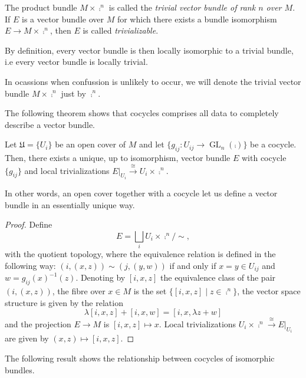 \begin{defi}\label{trivial_bundle}
  The product bundle $M\times \comp^n$ is called the \emph{trivial
    vector bundle of rank $n$ over $M$}. If $E$ is a vector bundle
  over $M$ for which there exists a bundle isomorphism
  $E\to M\times \comp^n$, then $E$ is called \emph{trivializable}.
\end{defi}

By definition, every vector bundle is then locally isomorphic to a
trivial bundle, i.e every vector bundle is locally trivial.

\begin{notation}
  In ocassions when confussion is unlikely to occur, we will denote
  the trivial vector bundle $M\times \comp^n$ just by $\comp^n$.
\end{notation}

The following theorem shows that cocycles comprises all data to
completely describe a vector bundle.

\begin{theorem}\label{construct_bundles}
  Let $\mathfrak{U}=\{U_i\}$ be an open cover of $M$ and let
  $\{g_{ij}:U_{ij}\to \operatorname{GL}_n(\comp )\}$ be a
  cocycle. Then, there exists a unique, up to isomorphism, vector
  bundle $E$ with cocycle $\{g_{ij}\}$ and local trivializations
  $E|_{U_i}\stackrel{\cong}{\longrightarrow}U_i\times \comp^n$.
\end{theorem}

In other words, an open cover together with a cocycle let us define a
vector bundle in an essentially unique way.

\begin{proof}
  Define
$$E=\bigsqcup_iU_i\times \comp^n / \sim ,$$
with the quotient topology, where the equivalence relation is defined
in the following way: $(i,(x,z))\sim (j,(y,w))$ if and only if
$x=y\in U_{ij}$ and $w=g_{ij}(x)^{-1}(z)$. Denoting by $[i,x,z]$ the
equivalence class of the pair $(i,(x,z))$, the fibre over $x\in M$ is
the set $\{[i,x,z]\; | \; z\in \comp^n\}$, the vector space structure
is given by the relation
$$\lambda [i,x,z]+[i,x,w]=[i,x,\lambda z+w]$$
and the projection $E\to M$ is $[i,x,z]\mapsto x$. Local
trivializations
$U_i\times \comp^n\stackrel{\cong}{\longrightarrow}E|_{U_i}$ are given
by $(x,z)\mapsto [i,x,z]$.
\end{proof}

The following result shows the relationship between cocycles of
isomorphic bundles.

